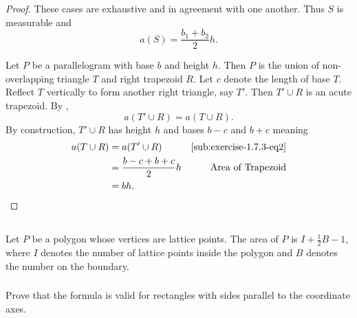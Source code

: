 \documentclass{report}
\begin{document}
\begin{proof}
    These cases are exhaustive and in agreement with one another.
    Thus $S$ is measurable and $$a(S) = \frac{b_1 + b_2}{2}h.$$

  \suitdivider

  Let $P$ be a parallelogram with base $b$ and height $h$.
  Then $P$ is the union of non-overlapping triangle $T$ and right trapezoid $R$.
  Let $c$ denote the length of base $T$.
  Reflect $T$ vertically to form another right triangle, say $T'$.
  Then $T' \cup R$ is an acute trapezoid.
  By ,
    \begin{equation}
      \label{sub:exercise-1.7.3-eq2}
      a(T' \cup R) = a(T \cup R).
    \end{equation}
  By construction, $T' \cup R$ has height $h$ and bases $b - c$ and $b + c$
    meaning
    \begin{align*}
      a(T \cup R)
        & = a(T' \cup R) & \eqref{sub:exercise-1.7.3-eq2} \\
        & = \frac{b - c + b + c}{2}h & \text{Area of Trapezoid} \\
        & = bh.
    \end{align*}

\end{proof}

\subsection{}%
\label{sub:exercise-1.7.4}

Let $P$ be a polygon whose vertices are lattice points.
The area of $P$ is $I + \frac{1}{2}B - 1$, where $I$ denotes the number of
  lattice points inside the polygon and $B$ denotes the number on the boundary.

\subsubsection{}%
\label{ssub:exercise-1.7.4a}

Prove that the formula is valid for rectangles with sides parallel to the
  coordinate axes.
\end{document}
